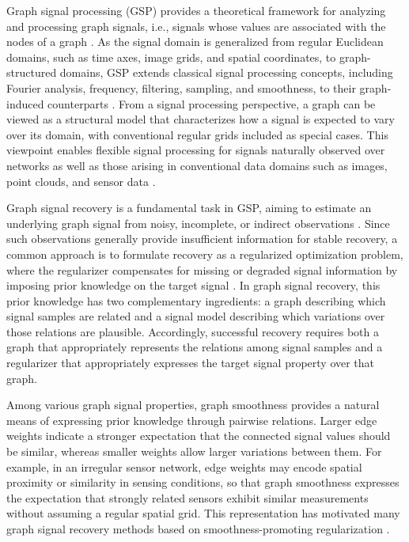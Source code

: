 Graph signal processing (GSP) provides a theoretical framework for analyzing and processing graph signals, i.e., signals whose values are associated with the nodes of a graph \cite{shuman2013emerging,sandryhaila2013discrete,ortega2018graph}.
As the signal domain is generalized from regular Euclidean domains, such as time axes, image grids, and spatial coordinates, to graph-structured domains, GSP extends classical signal processing concepts, including Fourier analysis, frequency, filtering, sampling, and smoothness, to their graph-induced counterparts \cite{sandryhaila2014frequency,isufi2024graphfilters,tanaka2020sampling}.
From a signal processing perspective, a graph can be viewed as a structural model that characterizes how a signal is expected to vary over its domain, with conventional regular grids included as special cases.
This viewpoint enables flexible signal processing for signals naturally observed over networks as well as those arising in conventional data domains such as images, point clouds, and sensor data \cite{cheung2018graphspectral,zeng2020pointcloud,jablonski2017sensor,chen2014bridge,yamagata2025robust,cheema2024shm}.

Graph signal recovery is a fundamental task in GSP, aiming to estimate an underlying graph signal from noisy, incomplete, or indirect observations \cite{onuki2016graph,berger2017graph,nagahama2022graph,yamagata2025robust}.
Since such observations generally provide insufficient information for stable recovery, a common approach is to formulate recovery as a regularized optimization problem, where the regularizer compensates for missing or degraded signal information by imposing prior knowledge on the target signal \cite{smola2003kernels,wang2016trend}.
In graph signal recovery, this prior knowledge has two complementary ingredients: a graph describing which signal samples are related and a signal model describing which variations over those relations are plausible.
Accordingly, successful recovery requires both a graph that appropriately represents the relations among signal samples and a regularizer that appropriately expresses the target signal property over that graph.

Among various graph signal properties, graph smoothness provides a natural means of expressing prior knowledge through pairwise relations.
Larger edge weights indicate a stronger expectation that the connected signal values should be similar, whereas smaller weights allow larger variations between them.
For example, in an irregular sensor network, edge weights may encode spatial proximity or similarity in sensing conditions, so that graph smoothness expresses the expectation that strongly related sensors exhibit similar measurements without assuming a regular spatial grid.
This representation has motivated many graph signal recovery methods based on smoothness-promoting regularization
\cite{chen2015variation,eslamlou2017smooth,pang2017graph,perraudin2017stationary,romero2017kernel,qiu2017timevarying}.

